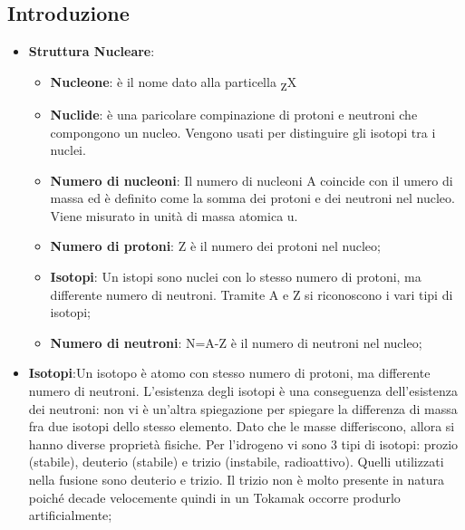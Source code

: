 \documentclass{article}
\def\SPSB#1#2{\rlap{\textsuperscript{\textcolor{black}{#1}}}\SB{#2}}
\def\SB#1{\textsubscript{\textcolor{black}{#1}}}
\begin{document}
\subsection{Introduzione}
\begin{itemize}
    \item \textbf{Struttura Nucleare}:\begin{itemize}
        \item \textbf{Nucleone}: è il nome dato alla particella \SPSB{A}{Z}X
        \item \textbf{Nuclide}: è una paricolare compinazione di protoni e neutroni che compongono un nucleo. Vengono usati per distinguire gli isotopi tra i nuclei.
        \item \textbf{Numero di nucleoni}: Il numero di nucleoni A coincide con il umero di massa ed è definito come la somma dei protoni e dei neutroni nel nucleo. Viene misurato in unità di massa atomica u.
        \item \textbf{Numero di protoni}: Z è il numero dei protoni nel nucleo;
        \item \textbf{Isotopi}: Un istopi sono nuclei con lo stesso numero di protoni, ma differente numero di neutroni. Tramite A e Z si riconoscono i vari tipi di isotopi;
        \item \textbf{Numero di neutroni}: N=A-Z è il numero di neutroni nel nucleo;
    \end{itemize}
    \item\textbf{Isotopi}:Un isotopo è atomo con stesso numero di protoni, ma differente numero di neutroni. L'esistenza degli isotopi è una conseguenza dell'esistenza dei neutroni: non vi è un'altra spiegazione per spiegare la differenza di massa fra due isotopi dello stesso elemento. Dato che le masse differiscono, allora si hanno diverse proprietà fisiche.\newline
    Per l'idrogeno vi sono 3 tipi di isotopi: prozio (stabile), deuterio (stabile) e trizio (instabile, radioattivo). Quelli utilizzati nella fusione sono deuterio e trizio. Il trizio non è molto presente in natura poiché decade velocemente quindi in un Tokamak occorre produrlo artificialmente;
\end{itemize}
\end{document}
